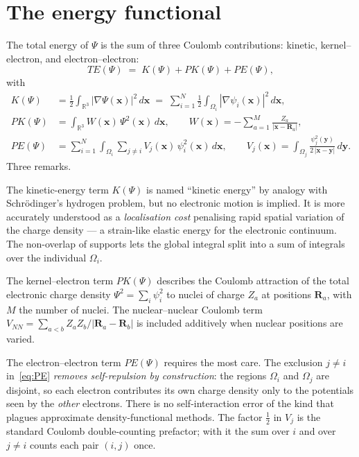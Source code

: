 \section{The energy functional}\label{sec:energy}

The total energy of $\Psi$ is the sum of three Coulomb contributions: kinetic, kernel--electron, and electron--electron:
\begin{equation}\label{eq:TE}
TE(\Psi) \;=\; K(\Psi) + PK(\Psi) + PE(\Psi),
\end{equation}
with
\begin{align}
K(\Psi)  &= \tfrac{1}{2} \int_{\mathbb{R}^3} |\nabla \Psi(\mathbf{x})|^2\, d\mathbf{x}
        \;=\; \sum_{i=1}^{N} \tfrac{1}{2} \int_{\Omega_i} |\nabla \psi_i(\mathbf{x})|^2\, d\mathbf{x},
        \label{eq:K} \\
PK(\Psi) &= \int_{\mathbb{R}^3} W(\mathbf{x})\, \Psi^2(\mathbf{x})\, d\mathbf{x},
        \qquad
        W(\mathbf{x}) = -\sum_{a=1}^{M} \frac{Z_a}{|\mathbf{x} - \mathbf{R}_a|},
        \label{eq:PK} \\
PE(\Psi) &= \sum_{i=1}^{N} \int_{\Omega_i} \sum_{j \ne i} V_j(\mathbf{x})\, \psi_i^2(\mathbf{x})\, d\mathbf{x},
        \qquad
        V_j(\mathbf{x}) = \int_{\Omega_j} \frac{\psi_j^2(\mathbf{y})}{2\,|\mathbf{x} - \mathbf{y}|}\, d\mathbf{y}.
        \label{eq:PE}
\end{align}
Three remarks.

The kinetic-energy term $K(\Psi)$ is named ``kinetic energy'' by analogy with Schr\"odinger's hydrogen problem, but no electronic motion is implied. It is more accurately understood as a \emph{localisation cost} penalising rapid spatial variation of the charge density --- a strain-like elastic energy for the electronic continuum. The non-overlap of supports lets the global integral split into a sum of integrals over the individual $\Omega_i$.

The kernel--electron term $PK(\Psi)$ describes the Coulomb attraction of the total electronic charge density $\Psi^2 = \sum_i \psi_i^2$ to nuclei of charge $Z_a$ at positions $\mathbf{R}_a$, with $M$ the number of nuclei. The nuclear--nuclear Coulomb term $V_{NN} = \sum_{a < b} Z_a Z_b / |\mathbf{R}_a - \mathbf{R}_b|$ is included additively when nuclear positions are varied.

The electron--electron term $PE(\Psi)$ requires the most care. The exclusion $j \ne i$ in~\eqref{eq:PE} \emph{removes self-repulsion by construction}: the regions $\Omega_i$ and $\Omega_j$ are disjoint, so each electron contributes its own charge density only to the potentials seen by the \emph{other} electrons. There is no self-interaction error of the kind that plagues approximate density-functional methods. The factor $\tfrac{1}{2}$ in $V_j$ is the standard Coulomb double-counting prefactor; with it the sum over $i$ and over $j \ne i$ counts each pair $(i,j)$ once.


